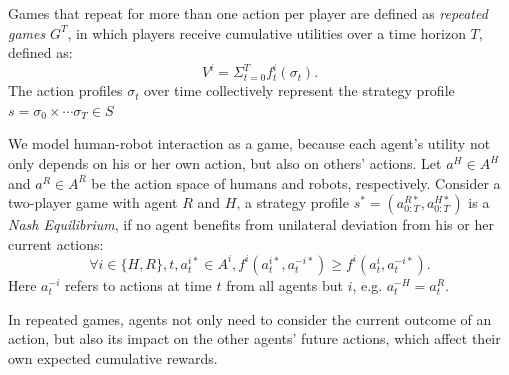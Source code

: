 \documentclass[letterpaper, 10 pt, conference]{ieeeconf}  %
\begin{document}
Games that repeat for more than one action per player are defined as 
\textit{repeated games} $G^T$, in which players receive cumulative utilities over a 
time horizon $T$, defined as:
\begin{equation}
  V^i=\Sigma_{t=0}^{T} f^i_t(\sigma_t).
\end{equation}
The action profiles $\sigma_t$ over time collectively represent the 
strategy profile $s = \sigma_0 \times \cdots \sigma_T \in S$ 

We model human-robot interaction as a game, because each agent's utility not 
only depends on his or her own action, but also on others' actions. Let 
$a^H \in A^H$ and $a^R \in A^R$ be the action space of humans and robots, 
respectively. Consider a two-player game with agent $R$ and $H$, a strategy profile $s^* = (a^{R*}_{0:T},a^{H*}_{0:T})$ is a \textit{Nash Equilibrium}, if no 
agent benefits from unilateral deviation from his or her current actions:
\begin{equation}
  \forall i \in \{H,R\}, t,a^{i*}_t \in A^i, f^i(a^{i*}_t,a^{-i*}_t) \geq f^i(a^{i}_t,a^{-i*}_t). 
\end{equation}
Here $a^{-i}_t$ refers to actions at time $t$ from all agents but $i$, e.g. $a_t^{-H} = a_t^R$. 

In repeated games, agents not only need to consider the current outcome of an 
action, but also its impact on the other agents' future actions, which affect 
their own expected cumulative rewards. 

\end{document}
